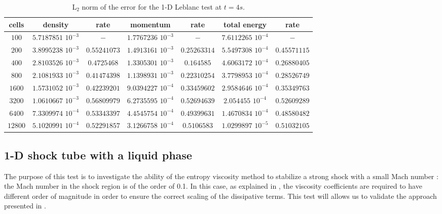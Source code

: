 \begin{table}[!htbp]
\begin{center}
 \caption{\label{tbl:l2_norm_leblanc} L$_2$ norm of the error for the 1-D Leblanc test at $t=4s$.}
 \begin{tabular}{|c|c|c|c|c|c|c|}
 \hline
   cells & density & rate & momentum & rate & total energy & rate \\ \hline
$100$ &   $5.7187851$ $10^{-3}$ & $-$ & $1.7767236$ $10^{-3}$ & $-$ & $7.6112265$  $10^{-4}$& $-$\\   \hline
$200$  &  $3.8995238$ $10^{-3}$ & $0.55241073$ & $1.4913161$ $10^{-3}$ & $0.25263314$ &  $5.5497308$ $10^{-4}$& $0.45571115$\\ \hline
$400$ & $2.8103526$ $10^{-3}$   & $0.4725468$ & $1.3305301$ $10^{-3}$ & $0.164585$ & $4.6063172$ $10^{-4}$ & $0.26880405$\\ \hline
$800$ & $2.1081933$ $10^{-3}$   & $0.41474398$ & $1.1398931$ $10^{-3}$ & $0.22310254$ & $3.7798953$ $10^{-4}$ & $0.28526749$\\ \hline
$1600$ & $1.5731052$ $10^{-3}$  & $0.42239201$ & $9.0394227$ $10^{-4}$ & $0.33459602$ & $2.9584646$ $10^{-4}$ & $0.35349763$\\ \hline
$3200$&$1.0610667$ $10^{-3}$    & $0.56809979$ & $6.2735595$ $10^{-4}$ & $0.52694639$ & $2.054455$ $10^{-4}$ & $0.52609289$\\ \hline
$6400$&$7.3309974$ $10^{-4}$    & $0.53343397$ & $4.4545754$ $10^{-4}$ & $0.49399631$ & $1.4670834$ $10^{-4}$ & $0.48580482$\\ \hline
 $12800$&$5.1020991$ $10^{-4}$  & $0.52291857$ & $3.1266758$ $10^{-4}$ & $0.5106583$ & $1.0299897$ $10^{-5}$ & $0.51032105$\\  \hline
\end{tabular}
\end{center}
\nonumber
\end{table}

\subsection{1-D shock tube with a liquid phase} \label{sec:liquid_shock}
The purpose of this test is to investigate the ability of the entropy viscosity method to stabilize a strong shock with a small Mach number \cite{abgrall}: the Mach number in the shock region is of the order of 0.1. In this case, as explained in , the viscosity coefficients are required to have different order of magnitude in order to ensure the correct scaling of the dissipative terms. This test will allows us to validate the approach presented in .  

